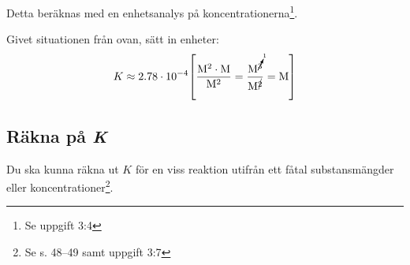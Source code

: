 Detta beräknas med en enhetsanalys på koncentrationerna\footnote{Se uppgift 3:4}.

\begin{exm}
    Givet situationen från ovan, sätt in enheter:
    \begin{equation*}
        K \approx 2.78 \cdot 10^{-4} \mathrm{ \left[\frac{M^2 \cdot M}{M^2} = \frac{M^{\cancelto{1}{3}}}{M^{\cancel{2}}} = M\right]}
    \end{equation*}
\end{exm}

\subsection{Räkna på \textit{K}}
\label{sec:räknak}
Du ska kunna räkna ut $K$ för en viss reaktion utifrån ett fåtal substansmängder eller koncentrationer\footnote{Se s. 48--49 samt uppgift 3:7}.

